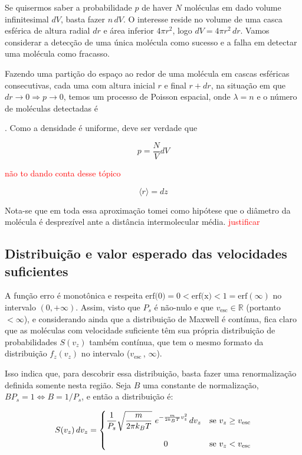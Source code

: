 \documentclass[12pt]{extarticle} %
\begin{document}
Se quisermos saber a probabilidade $p$ de haver $N$ moléculas em dado volume infinitesimal $dV$, basta fazer $n \, dV$. O interesse reside no volume de uma casca esférica de altura radial $dr$ e área inferior $4\pi r^2$, logo $dV\!=\!4\pi r^2 \, dr$. Vamos considerar a detecção de uma única molécula como sucesso e a falha em detectar uma molécula como fracasso.

Fazendo uma partição do espaço ao redor de uma molécula em cascas esféricas consecutivas, cada uma com altura inicial $r$ e final $r+dr$, na situação em que $dr\rightarrow 0 \Rightarrow p\rightarrow 0$, temos um processo de Poisson espacial, onde $\lambda = n$ e o número de moléculas detectadas é 





. Como a densidade é uniforme, deve ser verdade que

$$p=\frac{N}{V} dV$$


\textcolor{red}{não to dando conta desse tópico}

$$\langle r \rangle = dz $$ 




Nota-se que em toda essa aproximação tomei como hipótese que o diâmetro da molécula é desprezível ante a distância intermolecular média. \textcolor{red}{justificar}



\subsection{Distribuição e valor esperado das velocidades suficientes}

A função erro é monotônica e respeita $\text{erf(0)}\!=\!0 < \text{erf(x)}\!<\!1\!=\!\text{erf}(\infty)$ no intervalo $(0,+\infty)$.  Assim, visto que $P_s$ é não-nulo e que $v_{\text{esc}}\!\in\!\mathbb{R}$ (portanto $<\!\infty$), e considerando ainda que a distribuição de Maxwell é contínua, fica claro que as moléculas com velocidade suficiente têm sua própria distribuição de probabilidades $S(v_z)$ também contínua, que tem o mesmo formato da distribuição $f_z(v_z)$ no intervalo ($v_{\text{esc}}\,$, $\infty$).

Isso indica que, para descobrir essa distribuição, basta fazer uma renormalização definida somente nesta região. Seja $B$ uma constante de normalização, $B P_s = 1 \Leftrightarrow B = 1 / P_s$, e então a distribuição é:

\begin{equation}
    S(v_z) \, dv_z = 
    \begin{cases} 
        \displaystyle\frac{1}{P_s} \sqrt{\frac{m}{2\pi k_BT}} \, \, e^{-\frac{m}{2k_BT}v_z^2} \, dv_z & \text{se } v_z \geq v_\text{esc} \\
        \\[-2mm]
        \quad\quad\quad\quad\quad\quad\quad 0 & \text{se } v_z < v_\text{esc}
    \end{cases} \notag
\end{equation}
\end{document}
